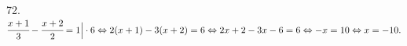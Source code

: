 72. $\cfrac{x+1}{3}-\cfrac{x+2}{2}=1\Big|\cdot6\Leftrightarrow
2(x+1)-3(x+2)=6\Leftrightarrow2x+2-3x-6=6\Leftrightarrow-x=10\Leftrightarrow x=-10.$\\
